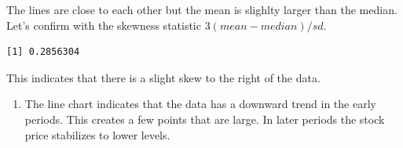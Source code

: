 \documentclass[
  letterpaper,
  DIV=11,
  numbers=noendperiod]{scrreprt}
\newenvironment{Shaded}{\begin{snugshade}}{\end{snugshade}}
\newcommand{\AttributeTok}[1]{\textcolor[rgb]{0.40,0.45,0.13}{#1}}
\newcommand{\ConstantTok}[1]{\textcolor[rgb]{0.56,0.35,0.01}{#1}}
\newcommand{\DecValTok}[1]{\textcolor[rgb]{0.68,0.00,0.00}{#1}}
\newcommand{\FunctionTok}[1]{\textcolor[rgb]{0.28,0.35,0.67}{#1}}
\newcommand{\NormalTok}[1]{\textcolor[rgb]{0.00,0.23,0.31}{#1}}
\newcommand{\OtherTok}[1]{\textcolor[rgb]{0.00,0.23,0.31}{#1}}
\newcommand{\SpecialCharTok}[1]{\textcolor[rgb]{0.37,0.37,0.37}{#1}}
\newcommand{\StringTok}[1]{\textcolor[rgb]{0.13,0.47,0.30}{#1}}
\providecommand{\tightlist}{%
  \setlength{\itemsep}{0pt}\setlength{\parskip}{0pt}}\usepackage{longtable,booktabs,array}
\begin{document}
The lines are close to each other but the mean is slighlty larger than
the median. Let's confirm with the skewness statistic
\(3(mean-median)/sd\).

\begin{Shaded}
\end{Shaded}

\begin{verbatim}
[1] 0.2856304
\end{verbatim}

This indicates that there is a slight skew to the right of the data.

\begin{enumerate}
\def\labelenumi{\arabic{enumi}.}
\setcounter{enumi}{2}
\tightlist
\item
  The line chart indicates that the data has a downward trend in the
  early periods. This creates a few points that are large. In later
  periods the stock price stabilizes to lower levels.
\end{enumerate}

\begin{Shaded}
\end{Shaded}
\end{document}

